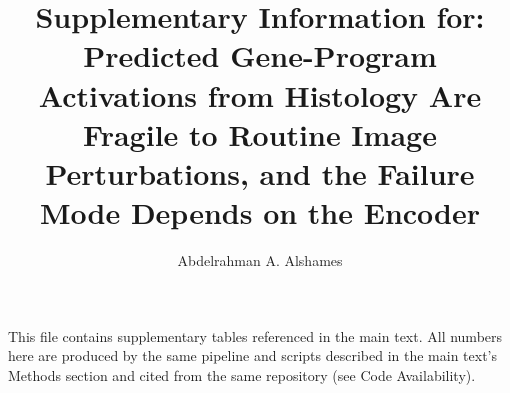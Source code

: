 \documentclass[11pt]{article}
\title{Supplementary Information for:\\
Predicted Gene-Program Activations from Histology Are Fragile to Routine Image Perturbations, and the Failure Mode Depends on the Encoder}
\author{Abdelrahman A. Alshames}
\date{}
\begin{document}
\maketitle

This file contains supplementary tables referenced in the main text. All numbers here are produced by the same pipeline and scripts described in the main text's Methods section and cited from the same repository (see Code Availability).
























\end{document}
